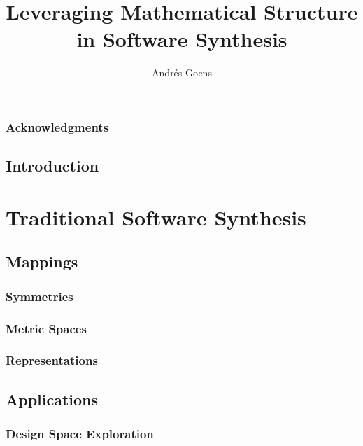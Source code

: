 \documentclass{report}
\title{Leveraging Mathematical Structure in Software Synthesis}
\author{Andr\'{e}s Goens}
\begin{document}
\date{}

\maketitle
\tableofcontents
\clearpage
\section*{Acknowledgments}


\chapter{Introduction}


\part{Traditional Software Synthesis}

\chapter{Mappings}

%
\section{Symmetries}
\section{Metric Spaces}
\section{Representations}

%

\chapter{Applications}

\section{Design Space Exploration}
\end{document}
